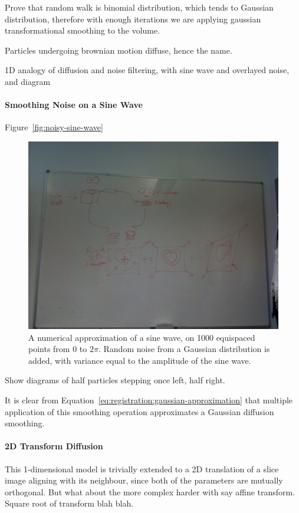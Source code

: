       Prove that random walk is binomial distribution, which tends to Gaussian distribution, therefore with enough iterations we are applying gaussian transformational smoothing to the volume.
      
      Particles undergoing brownian motion diffuse, hence the name.
      
      1D analogy of diffusion and noise filtering, with sine wave and overlayed noise, and diagram
        
      \paragraph{Smoothing Noise on a Sine Wave}
        Figure~\ref{fig:noisy-sine-wave}
        \begin{figure}[htbp]
          \centering
          \includegraphics[height=0.7\textwidth]{Ch6/Figs/process_diagram}
          \caption{A numerical approximation of a sine wave, on 1000 equispaced points from $0$ to $2\pi$. Random noise from a Gaussian distribution is added, with variance equal to the amplitude of the sine wave.}
        \end{figure}
      
        
        Show diagrams of half particles stepping once left, half right.
        
        It is clear from Equation~\ref{eq:registration:gaussian-approximation} that multiple application of this smoothing operation approximates a Gaussian diffusion smoothing.

      \paragraph{2D Transform Diffusion}
        This 1-dimensional model is trivially extended to a 2D translation of a slice image aligning with its neighbour, since both of the parameters are mutually orthogonal. But what about the more complex harder with say affine transform. Square root of transform blah blah.


